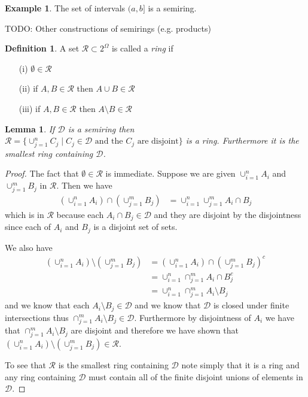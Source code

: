 \documentclass{amsart}
\newtheorem{lem}[thm]{Lemma}
\theoremstyle{remark}
\theoremstyle{definition}
\newtheorem{defn}[thm]{Definition}
\newtheorem{examp}[thm]{Example}
\begin{document}
\begin{examp}The set of intervals $(a,b]$ is a semiring.
\end{examp}

TODO: Other constructions of semirings (e.g. products)

\begin{defn}A set $\mathcal{R} \subset 2^\Omega$ is called a
  \emph{ring} if 
\begin{itemize}
\item[(i)]$\emptyset \in \mathcal{R}$
\item[(ii)]if $A, B \in \mathcal{R}$ then $A \cup B \in \mathcal{R}$
\item[(iii)]if $A, B \in \mathcal{R}$ then $A \setminus B \in \mathcal{R}$
\end{itemize}
\end{defn}

\begin{lem}If $\mathcal{D}$ is a semiring then $\mathcal{R} = \lbrace
  \cup_{j=1}^n C_j \mid C_j \in \mathcal{D} \text{ and the $C_j$ are
    disjoint} \rbrace$ is a ring.  Furthermore it is the smallest ring
  containing $\mathcal{D}$.
\end{lem}
\begin{proof}
The fact that $\emptyset \in \mathcal{R}$ is immediate.  Suppose we
are given $\cup_{i=1}^n A_i$ and $\cup_{j=1}^m B_j$ in
$\mathcal{R}$. Then we have
\begin{align}
\left ( \cup_{i=1}^n A_i \right ) \cap \left ( \cup_{j=1}^m B_j \right
) &= \cup_{i=1}^n \cup_{j=1}^m A_i \cap B_j
\end{align}
which is in $\mathcal{R}$ because each $A_i \cap B_j \in \mathcal{D}$
and they are disjoint by the disjointness since each of $A_i$ and
$B_j$ is a disjoint set of sets.  

We also have 
\begin{align}
\left ( \cup_{i=1}^n A_i \right ) \setminus \left ( \cup_{j=1}^m B_j \right
) &=\left ( \cup_{i=1}^n A_i \right ) \cap \left ( \cup_{j=1}^m B_j \right
)^c \\
&=\cup_{i=1}^n \cap_{j=1}^m A_i \cap B_j^c \\
&=\cup_{i=1}^n \cap_{j=1}^m A_i \setminus B_j
\end{align}
and we know that each $A_i \setminus B_j \in \mathcal{D}$ and we know
that $\mathcal{D}$ is closed under finite intersections thus
$\cap_{j=1}^m A_i \setminus B_j \in \mathcal{D}$.  Furthermore by
disjointness of $A_i$ we have that $\cap_{j=1}^m A_i \setminus B_j$
are disjoint and therefore we have shown that $\left ( \cup_{i=1}^n A_i \right ) \setminus \left ( \cup_{j=1}^m B_j \right
) \in \mathcal{R}$.

To see that $\mathcal{R}$ is the smallest ring containing
$\mathcal{D}$ note simply that it is a ring and any ring containing
$\mathcal{D}$ must contain all of the finite disjoint unions of
elements in $\mathcal{D}$.
\end{proof}
\end{document}
